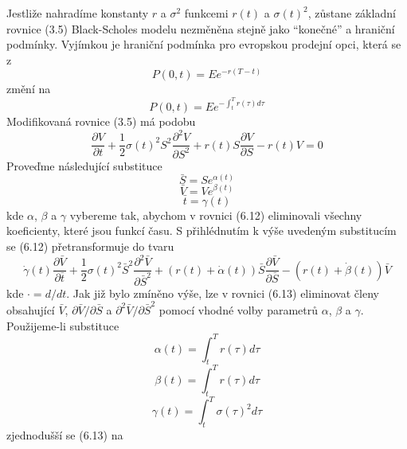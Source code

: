 \documentclass[a4paper]{book}
\begin{document}
Jestliže nahradíme konstanty $r$ a $\sigma^2$ funkcemi $r(t)$ a $\sigma(t)^2$, zůstane základní rovnice (3.5) Black-Scholes modelu nezměněna stejně jako ``konečné'' a hraniční podmínky. Vyjímkou je hraniční podmínka pro evropskou prodejní opci, která se z
\begin{equation*}
P(0,t) = Ee^{-r(T - t)}
\end{equation*}
změní na
\begin{equation*}
P(0,t) = Ee^{-\int_t^T r(\tau) d \tau}
\end{equation*}
Modifikovaná rovnice (3.5) má podobu
\begin{equation}
\frac{\partial V}{\partial t} + \frac{1}{2}\sigma(t)^2 S^2\frac{\partial^2 V}{\partial S^2} + r(t)S \frac{\partial V}{\partial S} - r(t)V = 0
\end{equation}
Proveďme následující substituce
\begin{equation*}
\bar{S} = Se^{\alpha(t)}
\end{equation*}
\begin{equation*}
\bar{V} = Ve^{\beta(t)}
\end{equation*}
\begin{equation*}
\bar{t} = \gamma (t)
\end{equation*}
kde $\alpha$, $\beta$ a $\gamma$ vybereme tak, abychom v rovnici (6.12) eliminovali všechny koeficienty, které jsou funkcí času. S přihlédnutím k výše uvedeným substitucím se (6.12) přetransformuje do tvaru
\begin{equation}
\dot{\gamma}(t)\frac{\partial \bar{V}}{\partial \bar{t}} + \frac{1}{2}\sigma(t)^2 \bar{S}^2 \frac{\partial^2 \bar{V}}{\partial \bar{S}^2} + (r(t) + \dot{\alpha}(t))\bar{S} \frac{\partial \bar{V}}{\partial \bar{S}} - (r(t) + \dot{\beta}(t))\bar{V}
\end{equation}
kde $\cdot = d /dt$. Jak již bylo zmíněno výše, lze v rovnici (6.13) eliminovat členy obsahující $\bar{V}$, $\partial \bar{V} / \partial \bar{S}$ a $\partial^2 \bar{V} / \partial \bar{S}^2$ pomocí vhodné volby parametrů $\alpha$, $\beta$ a $\gamma$. Použijeme-li substituce
\begin{equation*}
\alpha(t) = \int_t^Tr(\tau) d \tau
\end{equation*}
\begin{equation*}
\beta(t) = \int_t^Tr(\tau) d \tau
\end{equation*}
\begin{equation*}
\gamma(t) = \int_t^T \sigma(\tau)^2 d \tau
\end{equation*}
zjednodušší se (6.13) na
\end{document}
